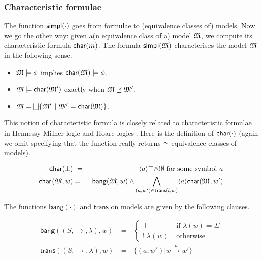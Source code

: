 \subsubsection{Characteristic formulae}

The function $\mathsf{simpl}(\cdot)$ goes from formulae to (equivalence
classes of) models. Now we go the other way: given a(n equivalence class of a) model $\frak{M}$, we
compute its characteristic formula $\mathsf{char}(m)$. The formula
$\mathsf{simpl}(\frak{M})$ characterises the model $\frak{M}$ in the following
sense. 

\begin{itemize}

\item  $\frak{M} \models \phi$ implies $\mathsf{char}(\frak{M}) \models \phi$.

\item  $\frak{M} \models \mathsf{char}( \frak{M}' )$ exactly when $\frak{M} \preceq \frak{M}'$.

\item $\frak{M} = \bigsqcup \{\frak{M}' \ |\ \frak{M}' \models \mathsf{char}(\frak{M}) \}$.

\end{itemize}


\NI This notion of characteristic formula is closely related to
characteristic formulae in Hennessy-Milner logic
\cite{AcetoL:chaforfata} and Hoare logics
\cite{HondaK:descriptive,ChargueraudA:provertcf}. Here is the
definition of $\mathsf{char}(\cdot)$ (again we omit specifying that the function really
returns $\simeq$-equivalence classes of models).

\begin{eqnarray*}
  \mathsf{char}(\bot) &\ =\ & \langle a \rangle \top \land ! \emptyset  \mbox{ for some symbol }a  \\
  \mathsf{char}(\frak{M}, w) & = & \mathsf{bang}(\frak{M},w) \land \bigwedge_{(a,w') \in \mathsf{trans}(l,w)} \langle a \rangle \mathsf{char}(\frak{M}, w')  
\end{eqnarray*}


\NI The functions $\mathsf{bang}(\cdot)$ and $\mathsf{trans}$ on
models are given by the following clauses.

\begin{eqnarray*}
  \mathsf{bang}((S,\rightarrow,\lambda),w) 
     & \ = \ & 
  \begin{cases}
    \top & \mbox{ if } \lambda(w) = \Sigma  \\
    ! \; \lambda(w) & \mbox{ otherwise }  
  \end{cases} \\
  \mathsf{trans}((S,\rightarrow, \lambda),w) & \ = \ & \{(a,w') | w \xrightarrow{a} w' \} 
\end{eqnarray*}

